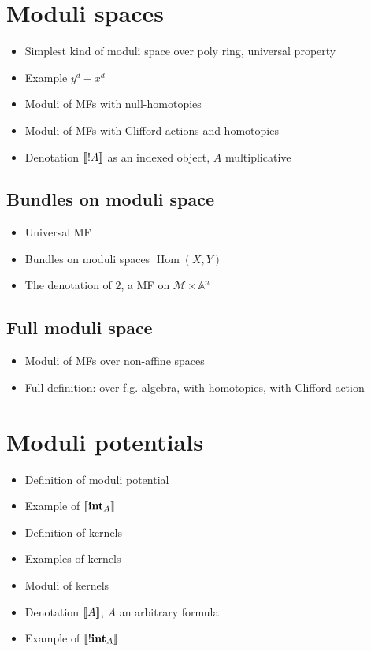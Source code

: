 \documentclass[english,letter paper,12pt,reqno]{article}
\theoremstyle{example}
\numberwithin{equation}{section}
\def\Hom{\operatorname{Hom}}
\def\inta{\bold{int}}
\begin{document}
\section{Moduli spaces}

\begin{itemize}
\item Simplest kind of moduli space over poly ring, universal property
\item Example $y^d - x^d$
\item Moduli of MFs with null-homotopies
\item Moduli of MFs with Clifford actions and homotopies
\item Denotation $\llbracket ! A \rrbracket$ as an indexed object, $A$ multiplicative
\end{itemize}

\subsection{Bundles on moduli space}

\begin{itemize}
\item Universal MF
\item Bundles on moduli spaces $\Hom(X,Y)$
\item The denotation of $2$, a MF on $\mathscr{M} \times \mathbb{A}^n$
\end{itemize}

\subsection{Full moduli space}

\begin{itemize}
\item Moduli of MFs over non-affine spaces
\item Full definition: over f.g. algebra, with homotopies, with Clifford action
\end{itemize}

\section{Moduli potentials}

\begin{itemize}
\item Definition of moduli potential
\item Example of $\den{\inta_A}$
\item Definition of kernels
\item Examples of kernels
\item Moduli of kernels
\item Denotation $\llbracket A \rrbracket$, $A$ an arbitrary formula
\item Example of $\den{!\inta_A}$
\end{itemize}
\end{document}
